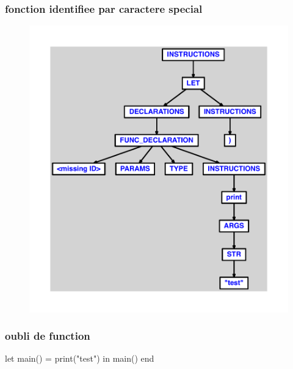 \documentclass{article}
\begin{document}
\subsubsection{fonction identifiee par caractere special}
\begin{figure}[H]\centering\includegraphics[max width=\textwidth]{ast/ast_204.pdf}\end{figure}\subsubsection{oubli de function}
\begin{verbatimtab}
let
	main() = print("test")
in main() end
\end{verbatimtab}
\end{document}
